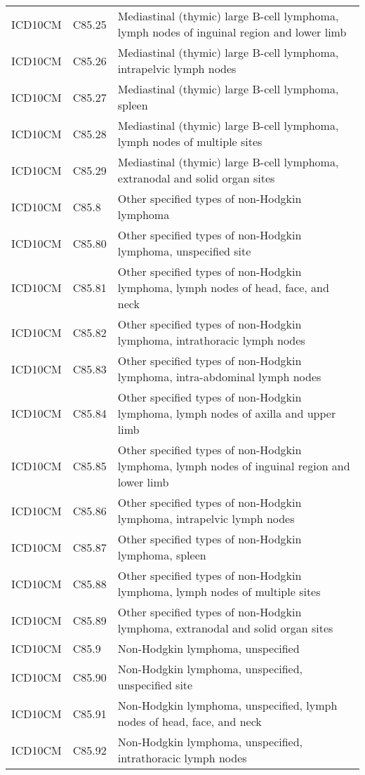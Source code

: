 \begin{table}[ht]
\begin{tabular}{lll}
  ICD10CM & C85.25 & Mediastinal (thymic) large B-cell lymphoma, lymph nodes of inguinal region and lower limb \\ 
  ICD10CM & C85.26 & Mediastinal (thymic) large B-cell lymphoma, intrapelvic lymph nodes \\ 
  ICD10CM & C85.27 & Mediastinal (thymic) large B-cell lymphoma, spleen \\ 
  ICD10CM & C85.28 & Mediastinal (thymic) large B-cell lymphoma, lymph nodes of multiple sites \\ 
  ICD10CM & C85.29 & Mediastinal (thymic) large B-cell lymphoma, extranodal and solid organ sites \\ 
  ICD10CM & C85.8 & Other specified types of non-Hodgkin lymphoma \\ 
  ICD10CM & C85.80 & Other specified types of non-Hodgkin lymphoma, unspecified site \\ 
  ICD10CM & C85.81 & Other specified types of non-Hodgkin lymphoma, lymph nodes of head, face, and neck \\ 
  ICD10CM & C85.82 & Other specified types of non-Hodgkin lymphoma, intrathoracic lymph nodes \\ 
  ICD10CM & C85.83 & Other specified types of non-Hodgkin lymphoma, intra-abdominal lymph nodes \\ 
  ICD10CM & C85.84 & Other specified types of non-Hodgkin lymphoma, lymph nodes of axilla and upper limb \\ 
  ICD10CM & C85.85 & Other specified types of non-Hodgkin lymphoma, lymph nodes of inguinal region and lower limb \\ 
  ICD10CM & C85.86 & Other specified types of non-Hodgkin lymphoma, intrapelvic lymph nodes \\ 
  ICD10CM & C85.87 & Other specified types of non-Hodgkin lymphoma, spleen \\ 
  ICD10CM & C85.88 & Other specified types of non-Hodgkin lymphoma, lymph nodes of multiple sites \\ 
  ICD10CM & C85.89 & Other specified types of non-Hodgkin lymphoma, extranodal and solid organ sites \\ 
  ICD10CM & C85.9 & Non-Hodgkin lymphoma, unspecified \\ 
  ICD10CM & C85.90 & Non-Hodgkin lymphoma, unspecified, unspecified site \\ 
  ICD10CM & C85.91 & Non-Hodgkin lymphoma, unspecified, lymph nodes of head, face, and neck \\ 
  ICD10CM & C85.92 & Non-Hodgkin lymphoma, unspecified, intrathoracic lymph nodes \\ 

\end{tabular}
\end{table}
